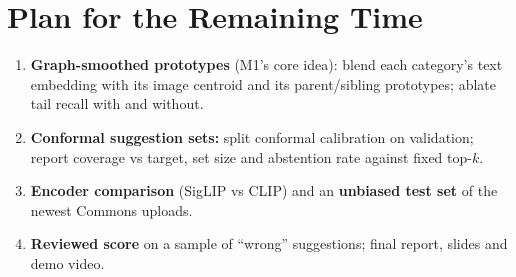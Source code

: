 \documentclass[10pt,twocolumn]{article}
\begin{document}
\section{Plan for the Remaining Time}
\begin{enumerate}
\item \textbf{Graph-smoothed prototypes} (M1's core idea): blend each category's text embedding with its image
centroid and its parent/sibling prototypes; ablate tail recall with and without.
\item \textbf{Conformal suggestion sets:} split conformal calibration on validation; report coverage vs target,
set size and abstention rate against fixed top-$k$.
\item \textbf{Encoder comparison} (SigLIP vs CLIP) and an \textbf{unbiased test set} of the newest Commons uploads.
\item \textbf{Reviewed score} on a sample of ``wrong'' suggestions; final report, slides and demo video.
\end{enumerate}
\end{document}
